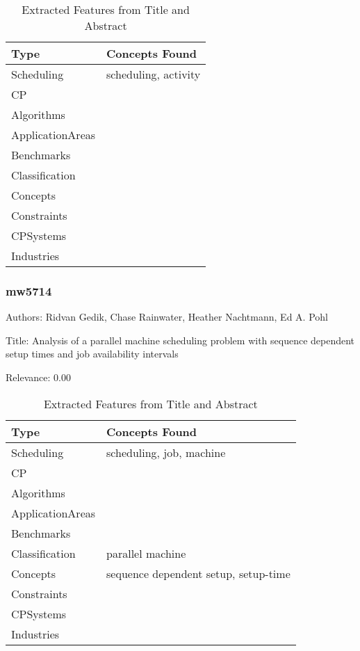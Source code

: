 {\scriptsize
\begin{longtable}{p{2cm}p{20cm}}
\caption{Extracted Features from Title and Abstract}\\ \toprule
Type & Concepts Found\\ \midrule
\endhead
\bottomrule
\endfoot
Scheduling & scheduling, activity\\ 
CP & \\ 
Algorithms & \\ 
ApplicationAreas & \\ 
Benchmarks & \\ 
Classification & \\ 
Concepts & \\ 
Constraints & \\ 
CPSystems & \\ 
Industries & \\ 
\end{longtable}
}



\subsubsection{mw5714}
\label{mw:mw5714}

Authors: Ridvan Gedik, Chase Rainwater, Heather Nachtmann, Ed A. Pohl

Title: Analysis of a parallel machine scheduling problem with sequence dependent setup times and job availability intervals

Relevance:  0.00

{\scriptsize
\begin{longtable}{p{2cm}p{20cm}}
\caption{Extracted Features from Title and Abstract}\\ \toprule
Type & Concepts Found\\ \midrule
\endhead
\bottomrule
\endfoot
Scheduling & scheduling, job, machine\\ 
CP & \\ 
Algorithms & \\ 
ApplicationAreas & \\ 
Benchmarks & \\ 
Classification & parallel machine\\ 
Concepts & sequence dependent setup, setup-time\\ 
Constraints & \\ 
CPSystems & \\ 
Industries & \\ 
\end{longtable}
}



